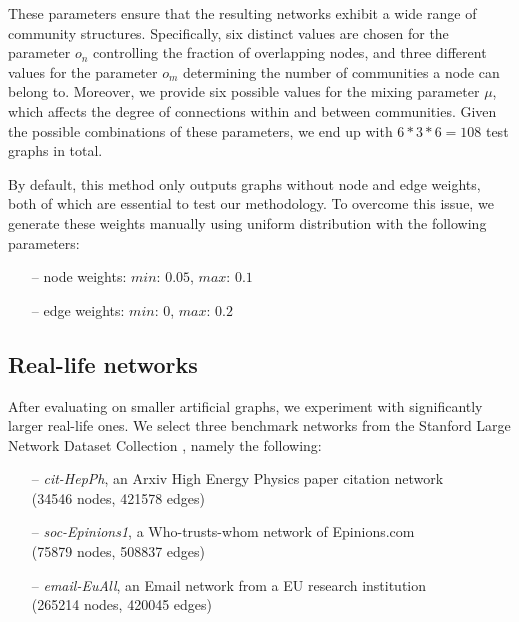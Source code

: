 \documentclass[pdflatex,sn-mathphys-ay]{sn-jnl}
\begin{document}
These parameters ensure that the resulting networks exhibit a wide range of community structures. Specifically, six distinct values are chosen for the parameter $o_n$ controlling the fraction of overlapping nodes, and three different values for the parameter $o_m$ determining the number of communities a node can belong to. Moreover, we provide six possible values for the mixing parameter $\mu$, which affects the degree of connections within and between communities. Given the possible combinations of these parameters, we end up with $6*3*6 = 108$ test graphs in total.

By default, this method only outputs graphs without node and edge weights, both of which are essential to test our methodology. To overcome this issue, we generate these weights manually using uniform distribution with the following parameters:

\begin{itemize}
\item[--] node weights: $min$: $0.05$, $max$: $0.1$
\item[--] edge weights: $min$: $0$, $max$: $0.2$
\end{itemize}


\subsection{Real-life networks}\label{subsec_reallife}

After evaluating on smaller artificial graphs, we experiment with significantly larger real-life ones. We select three benchmark networks from the Stanford Large Network Dataset Collection \citep{stanfordlarge}, namely the following:

\begin{itemize}
\setlength\itemsep{0.5em}
\item[--] \textit{cit-HepPh}, an Arxiv High Energy Physics paper citation network\\
(34546 nodes, 421578 edges)
\item[--] \textit{soc-Epinions1}, a Who-trusts-whom network of Epinions.com\\
(75879 nodes, 508837 edges)
\item[--] \textit{email-EuAll}, an Email network from a EU research institution\\
(265214 nodes, 420045 edges)
\end{itemize}
\end{document}
